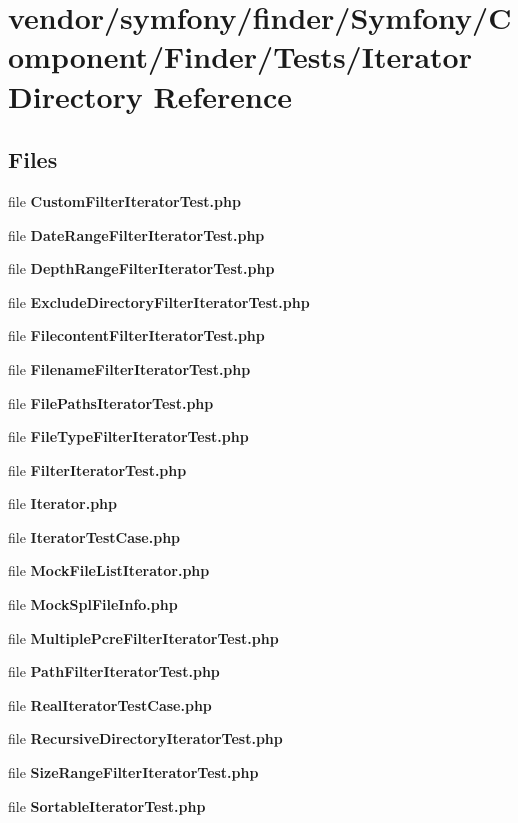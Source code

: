 \section{vendor/symfony/finder/\+Symfony/\+Component/\+Finder/\+Tests/\+Iterator Directory Reference}
\label{dir_9ec8bc29e553236f847a4a3290b1aad0}
\subsection*{Files}
\begin{DoxyCompactItemize}
\item 
file {\bf Custom\+Filter\+Iterator\+Test.\+php}
\item 
file {\bf Date\+Range\+Filter\+Iterator\+Test.\+php}
\item 
file {\bf Depth\+Range\+Filter\+Iterator\+Test.\+php}
\item 
file {\bf Exclude\+Directory\+Filter\+Iterator\+Test.\+php}
\item 
file {\bf Filecontent\+Filter\+Iterator\+Test.\+php}
\item 
file {\bf Filename\+Filter\+Iterator\+Test.\+php}
\item 
file {\bf File\+Paths\+Iterator\+Test.\+php}
\item 
file {\bf File\+Type\+Filter\+Iterator\+Test.\+php}
\item 
file {\bf Filter\+Iterator\+Test.\+php}
\item 
file {\bf Iterator.\+php}
\item 
file {\bf Iterator\+Test\+Case.\+php}
\item 
file {\bf Mock\+File\+List\+Iterator.\+php}
\item 
file {\bf Mock\+Spl\+File\+Info.\+php}
\item 
file {\bf Multiple\+Pcre\+Filter\+Iterator\+Test.\+php}
\item 
file {\bf Path\+Filter\+Iterator\+Test.\+php}
\item 
file {\bf Real\+Iterator\+Test\+Case.\+php}
\item 
file {\bf Recursive\+Directory\+Iterator\+Test.\+php}
\item 
file {\bf Size\+Range\+Filter\+Iterator\+Test.\+php}
\item 
file {\bf Sortable\+Iterator\+Test.\+php}
\end{DoxyCompactItemize}
